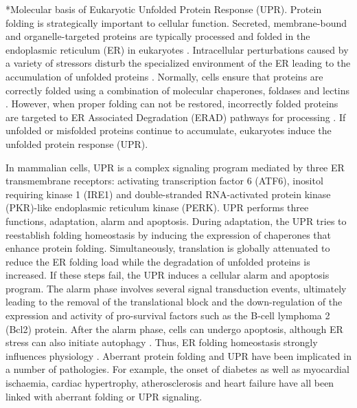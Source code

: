 \documentclass[12pt]{article}
\makeatletter
\renewcommand\section{\@startsection
	{subsection}{2}{0mm}
	{-0.2in}
	{0.05\baselineskip}
	{\normalfont\normalsize\bfseries}}
\makeatother
\begin{document}
\setcounter{page}{1}

\section*{Molecular basis of Eukaryotic Unfolded Protein Response (UPR).}
Protein folding is strategically important to cellular function. Secreted, membrane-bound and organelle-targeted proteins are typically processed and folded in the endoplasmic reticulum (ER) in eukaryotes \citep{naidoo2009er,ron2002translational,kaufman2002unfolded}. Intracellular perturbations caused by a variety of stressors disturb the specialized environment of the ER leading to the accumulation of unfolded proteins \citep{ellgaard2003qce,Fonseca:2009fk}. Normally, cells ensure that proteins are correctly folded using a combination of molecular chaperones, foldases and lectins \citep{naidoo2009er}. However, when proper folding can not be restored, incorrectly folded proteins are targeted to ER Associated Degradation (ERAD) pathways for processing \citep{kaufman2002unfolded}. If unfolded or misfolded proteins continue to accumulate, eukaryotes induce the unfolded protein response (UPR).

In mammalian cells, UPR is a complex signaling program mediated by three ER transmembrane receptors: activating transcription factor 6 (ATF6), inositol requiring kinase 1 (IRE1) and double-stranded RNA-activated protein kinase (PKR)-like endoplasmic reticulum kinase (PERK). UPR performs three functions, adaptation, alarm and apoptosis. During adaptation, the UPR tries to reestablish folding homeostasis by inducing the expression of chaperones that enhance protein folding. Simultaneously, translation is globally attenuated to reduce the ER folding load while the degradation of unfolded proteins is increased. If these steps fail, the UPR induces a cellular alarm and apoptosis program. The alarm phase involves several signal transduction events, ultimately leading to the removal of the translational block and the down-regulation of the expression and activity of pro-survival factors such as the B-cell lymphoma 2 (Bcl2) protein. After the alarm phase, cells can undergo apoptosis, although ER stress can also initiate autophagy \citep{ogata2006aac,yorimitsu2006ers,bernales2006ace,kamimoto2006iic,hoyerhansen2007cmc,kouroku2006esp,fujita2007ter}. Thus, ER folding homeostasis strongly influences physiology \citep{Fonseca:2009fk}. Aberrant protein folding and UPR have been implicated in a number of pathologies. For example, the onset of diabetes \citep{schnell2009model} as well as myocardial ischaemia, cardiac hypertrophy, atherosclerosis and heart failure \citep{glembotski2007ers} have all been linked with aberrant folding or UPR signaling. 
\end{document}

